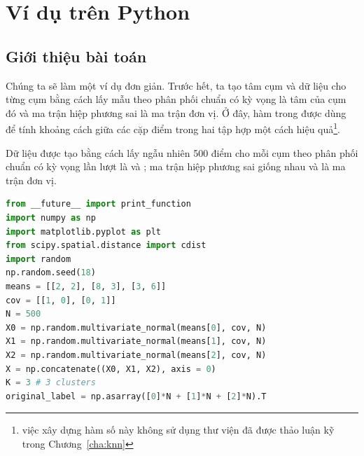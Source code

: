 \section{Ví dụ trên Python}


\subsection{Giới thiệu bài toán}
Chúng ta sẽ làm một ví dụ đơn giản. Trước hết, ta tạo tâm cụm và dữ liệu cho
từng cụm bằng cách lấy mẫu theo phân phối chuẩn có kỳ vọng là tâm của
cụm đó và ma trận hiệp phương sai là ma trận đơn vị. Ở đây, hàm
 trong  được dùng để
tính khoảng cách giữa các cặp điểm trong hai tập hợp một cách hiệu
quả\footnote{việc xây dựng hàm số này không sử dụng thư viện đã được thảo luận
kỹ trong Chương~\ref{cha:knn}}.

Dữ liệu được tạo bằng cách lấy ngẫu nhiên 500 điểm cho mỗi cụm theo phân
phối chuẩn có kỳ vọng lần lượt là  và
; ma trận hiệp phương sai giống nhau và là ma trận đơn vị.
\begin{lstlisting}[language=Python]
from __future__ import print_function
import numpy as np
import matplotlib.pyplot as plt
from scipy.spatial.distance import cdist
import random
np.random.seed(18)
means = [[2, 2], [8, 3], [3, 6]]
cov = [[1, 0], [0, 1]]
N = 500
X0 = np.random.multivariate_normal(means[0], cov, N)
X1 = np.random.multivariate_normal(means[1], cov, N)
X2 = np.random.multivariate_normal(means[2], cov, N)
X = np.concatenate((X0, X1, X2), axis = 0)
K = 3 # 3 clusters
original_label = np.asarray([0]*N + [1]*N + [2]*N).T
\end{lstlisting}







